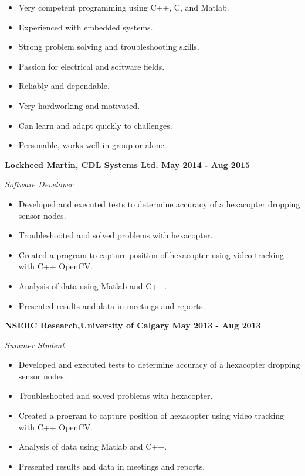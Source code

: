 \documentclass[12pt]{article} %
\begin{document}
\bigskip
{} 
\medskip
\begin{itemize}[noitemsep]
\item Very competent programming using C++, C, and Matlab. 
\item Experienced with embedded systems.
\item Strong problem solving and troubleshooting skills.
\item Passion for electrical and software fields.
\bigskip
\item Reliably and dependable. 
\item Very hardworking and motivated.
\item Can learn and adapt quickly to challenges.
\item Personable, works well in group or alone.
\end{itemize}
\noindent %


\bigskip
{} 
\medskip

\noindent \centerline{ \bf Lockheed Martin, CDL Systems Ltd. \hfill May 2014 - Aug 2015}
\indent \emph{ Software Developer } 
\begin{itemize}[noitemsep]
  \item Developed and executed tests to determine accuracy of a hexacopter dropping sensor nodes.
  \item Troubleshooted and solved problems with hexacopter.
  \item Created a program to capture position of hexacopter using video tracking with C++ OpenCV.
  \item Analysis of data using Matlab and C++.
  \item Presented results and data in meetings and reports.
\end{itemize}

\noindent \centerline{ \bf NSERC Research,University of Calgary \hfill May 2013 - Aug 2013}
\indent \emph{ Summer Student } 
\begin{itemize}[noitemsep]
  \item Developed and executed tests to determine accuracy of a hexacopter dropping sensor nodes.
  \item Troubleshooted and solved problems with hexacopter.
  \item Created a program to capture position of hexacopter using video tracking with C++ OpenCV.
  \item Analysis of data using Matlab and C++.
  \item Presented results and data in meetings and reports.
\end{itemize}
\end{document}
